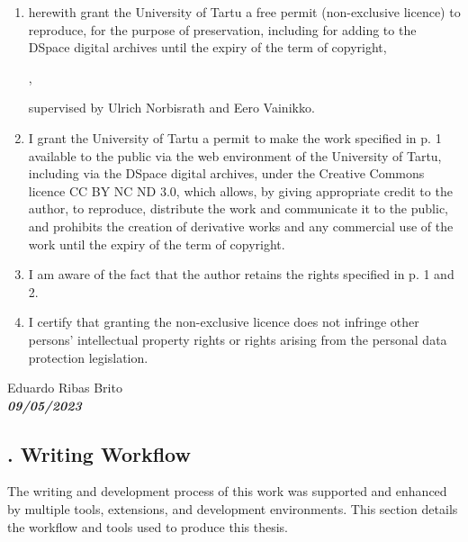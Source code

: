 \begin{enumerate}
\item
herewith grant the University of Tartu a free permit (non-exclusive licence) to
reproduce, for the purpose of preservation, including for adding to the DSpace digital archives until the expiry of the term of copyright,
\par
\textbf{\thesistitle{}}, %
\par
supervised by Ulrich Norbisrath and Eero Vainikko. %
\item
I grant the University of Tartu a permit to make the work specified in p. 1 available to the public via the web environment of the University of Tartu, including via the DSpace digital archives, under the Creative Commons licence CC BY NC ND 3.0, which allows, by giving appropriate credit to the author, to reproduce, distribute the work and communicate it to the public, and prohibits the creation of derivative works and any commercial use of the work until the expiry of the term of copyright.
\item
I am aware of the fact that the author retains the rights specified in p. 1 and 2.
\item
I certify that granting the non-exclusive licence does not infringe other persons' intellectual property rights or rights arising from the personal data protection legislation. 
\end{enumerate}

\noindent
Eduardo Ribas Brito\\ %
\textbf{\textsl{09/05/2023}}





\subsection*{. Writing Workflow} \label{appendix:writing-workflow}


The writing and development process of this work was supported and enhanced by multiple tools, extensions, and development environments. This section details the workflow and tools used to produce this thesis.

